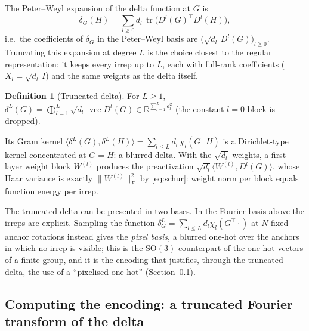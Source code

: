 \documentclass[a4paper,11pt]{article}
\theoremstyle{remark}
\theoremstyle{definition}
\newtheorem{definition}[proposition]{Definition}
\newcommand{\R}{\mathbb{R}}
\newcommand{\vect}{\operatorname{vec}}
\newcommand{\tr}{\operatorname{tr}}
\newcommand{\SO}{\mathrm{SO}(3)}
\newcommand{\ip}[2]{\langle #1, #2 \rangle}
\begin{document}
The Peter--Weyl expansion of the delta function at $G$ is
\begin{equation}
\delta_G(H)=\sum_{l\ge0}d_l\,\tr\bigl(D^l(G)^\top D^l(H)\bigr),
\end{equation}
i.e.\ the coefficients of $\delta_G$ in the Peter--Weyl basis are
$\bigl(\sqrt{d_l}\,D^l(G)\bigr)_{l\ge0}$. Truncating this expansion at degree $L$ is
the choice closest to the regular representation: it keeps every irrep up to $L$,
each with full-rank coefficients ($X_l=\sqrt{d_l}\,I$) and the same weights as the
delta itself.

\begin{definition}[Truncated delta]
For $L\ge1$, $\delta^L(G)=\bigoplus_{l=1}^{L}\sqrt{d_l}\,\vect D^l(G)\in
\R^{\sum_{l=1}^L d_l^2}$ (the constant $l=0$ block is dropped).
\end{definition}

Its Gram kernel $\ip{\delta^L(G)}{\delta^L(H)}=\sum_{l\le L}d_l\,\chi_l(G^\top
H)$ is a Dirichlet-type kernel concentrated at $G=H$: a blurred delta.
With the $\sqrt{d_l}$ weights, a first-layer weight block $W^{(l)}$ produces
the preactivation $\sqrt{d_l}\ip{W^{(l)}}{D^l(G)}$, whose Haar variance is
exactly $\|W^{(l)}\|_F^2$ by \eqref{eq:schur}: weight norm per block equals
function energy per irrep.

The truncated delta can be presented in two bases. In the Fourier basis above the
irreps are explicit. Sampling the function $\delta^L_G=\sum_{l\le L}d_l\chi_l(G^\top\cdot)$
at $N$ fixed anchor rotations instead gives the \emph{pixel basis}, a blurred
one-hot over the anchors in which no irrep is visible; this is the $\SO$
counterpart of the one-hot vectors of a finite group, and it is the encoding that
justifies, through the truncated delta, the use of a ``pixelised one-hot''
(Section~\ref{sec:computing-encoding}).

\subsection{Computing the encoding: a truncated Fourier transform of the delta}
\label{sec:computing-encoding}
\end{document}
